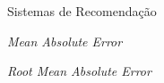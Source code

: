 \item [SR]      Sistemas de Recomendação
\item [MAE]     \textit{Mean Absolute Error}
\item [RMSE]    \textit{Root Mean Absolute Error}